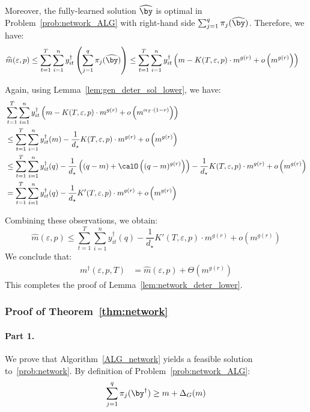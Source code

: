 \documentclass[blindrev]{informs3noheader}
\begin{document}
Moreover, the fully-learned solution $\widehat{\by}$ is optimal in Problem~\eqref{prob:network_ALG} with right-hand side $\sum_{j=1}^q \pi_{j}(\widehat{\by})$. Therefore, we have:
\begin{align*}
\widehat{m}(\varepsilon,p)&\leq \sum_{t=1}^T \sum_{i=1}^n y_{it}^\dagger\left(\sum_{j=1}^q \pi_{j}(\widehat{\by})\right)
\leq \sum_{t=1}^T \sum_{i=1}^n y_{it}^\dagger\left(m-K(T,\varepsilon,p)\cdot m^{g(r)}+ o\left(m^{g(r)}\right)\right)
\end{align*}

Again, using Lemma~\ref{lem:gen_deter_sol_lower}, we have:
\begin{align*}
&\sum_{t=1}^T \sum_{i=1}^n y_{it}^\dagger\left(m - K(T,\varepsilon,p)\cdot m^{g(r)}+o\left(m^{\alpha_T\cdot(1-r)}\right)\right)\\
&\leq \sum_{t=1}^T \sum_{i=1}^n y_{it}^\dagger(m)-\frac{1}{d_\star}K(T,\varepsilon,p)\cdot m^{g(r)} + o\left(m^{g(r)}\right)\\
&\leq \sum_{t=1}^T \sum_{i=1}^n y_{it}^\dagger(q)-\frac{1}{d_\star}\left((q-m)+\calO\left((q-m)^{g(r)}\right)\right)-\frac{1}{d_\star}K(T,\varepsilon,p)\cdot m^{g(r)} + o\left(m^{g(r)}\right)\\
&= \sum_{t=1}^T \sum_{i=1}^n y_{it}^\dagger(q)-\frac{1}{d_\star}K'(T,\varepsilon,p)\cdot m^{g(r)} + o\left(m^{g(r)}\right)
\end{align*}

Combining these observations, we obtain:
$$\widehat{m}(\varepsilon,p)\leq\sum_{t=1}^T \sum_{i=1}^n y_{it}^\dagger(q)-\frac{1}{d_\star}K'(T,\varepsilon,p)\cdot m^{g(r)} + o\left(m^{g(r)}\right)$$
We conclude that:
\begin{align*}
m^\dagger(\varepsilon, p,T)
&= \widehat{m}(\varepsilon,p)+\Theta\left(m^{g(r)}\right)
\end{align*}
This completes the proof of Lemma~\ref{lem:network_deter_lower}. \hfill\Halmos

\subsubsection*{Proof of Theorem~\ref{thm:network}}

\paragraph{Part 1.}

We prove that Algorithm~\ref{ALG_network} yields a feasible solution to~\eqref{prob:network}. By definition of Problem~\eqref{prob:network_ALG}:
\[\sum_{j=1}^q \pi_{j}(\by^\dagger) \geq m + \Delta_G(m)\]
\end{document}
